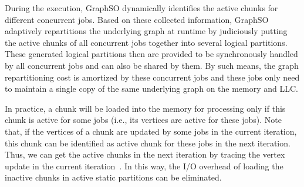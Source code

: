 \documentclass[10pt,journal,compsoc]{IEEEtran}
\begin{document}
During the execution, GraphSO dynamically identifies the active chunks for different concurrent jobs. Based on these collected information, GraphSO adaptively repartitions the underlying graph at runtime by judiciously putting the active chunks of all concurrent jobs together into several logical partitions.
These generated logical partitions then are provided to be synchronously handled by all concurrent jobs and can also be shared by them.
By such means, the graph repartitioning cost is amortized by these concurrent jobs and these jobs only need to maintain a single copy of the same underlying graph on the memory and LLC.

In practice, a chunk will be loaded into the memory for processing only if this chunk is active for some jobs (i.e., its vertices are active for these jobs).
Note that, if the vertices of a chunk are updated by some jobs in the current iteration, this chunk can be identified as active chunk for these jobs in the next iteration.
Thus, we can get the active chunks in the next iteration by tracing the vertex update in the current iteration~\cite{G-store}.
In this way, the I/O overhead of loading the inactive chunks in active static partitions can be eliminated.


\end{document}
